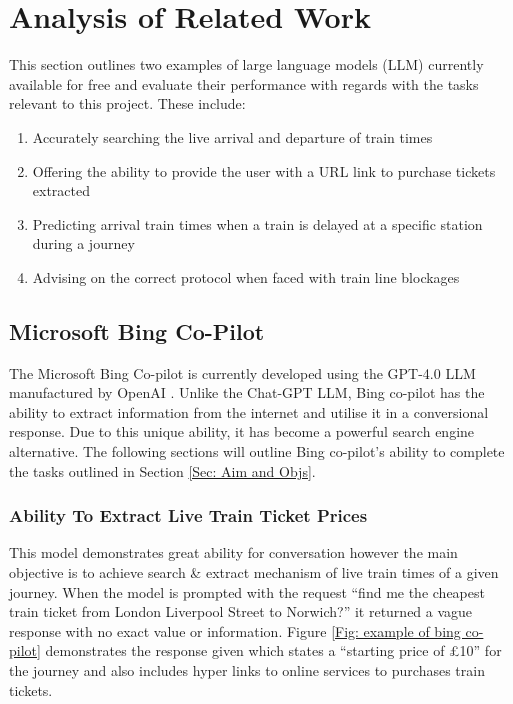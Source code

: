 \section{Analysis of Related Work}\label{sec: related works}
This section outlines two examples of large language models (LLM) currently available for free and evaluate their performance with regards with the tasks relevant to this project. These include:
\begin{enumerate}
    \item Accurately searching the live arrival and departure of train times
    \item Offering the ability to provide the user with a URL link to purchase tickets extracted
    \item Predicting arrival train times when a train is delayed at a specific station during a journey
    \item Advising on the correct protocol when faced with train line blockages
\end{enumerate}
\subsection{Microsoft Bing Co-Pilot}\label{Sec: Review Bing co-pilot}
The Microsoft Bing Co-pilot is currently developed using the GPT-4.0 LLM manufactured by OpenAI \citep{bing-gpt4}. Unlike the Chat-GPT LLM, Bing co-pilot has the ability to extract information from the internet and utilise it in a conversional response. Due to this unique ability, it has become a powerful search engine alternative. The following sections will outline Bing co-pilot's ability to complete the tasks outlined in Section \ref{Sec: Aim and Objs}.

\subsubsection{Ability To Extract Live Train Ticket Prices}
This model demonstrates great ability for conversation however the main objective is to achieve search \& extract mechanism of live train times of a given journey. When the model is prompted with the request ``find me the cheapest train ticket from London Liverpool Street to Norwich?'' it returned a vague response with no exact value or information. Figure \ref{Fig: example of bing co-pilot} demonstrates the response given which states a ``starting price of £10'' for the journey and also includes hyper links to online services to purchases train tickets.\vspace{0.5cm}

